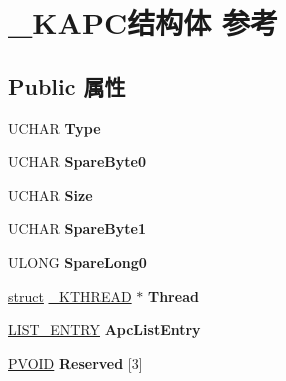 \hypertarget{struct___k_a_p_c}{}\section{\+\_\+\+K\+A\+P\+C结构体 参考}
\label{struct___k_a_p_c}
\subsection*{Public 属性}
\begin{DoxyCompactItemize}
\item 
\mbox{\label{struct___k_a_p_c_a686511290c21cdd0fea845cb82034a51}} 
U\+C\+H\+AR {\bfseries Type}
\item 
\mbox{\label{struct___k_a_p_c_aaeb24478501b33970c47321e8985f81d}} 
U\+C\+H\+AR {\bfseries Spare\+Byte0}
\item 
\mbox{\label{struct___k_a_p_c_a00c12ad5a438060a14a4ac00e5fa17a4}} 
U\+C\+H\+AR {\bfseries Size}
\item 
\mbox{\label{struct___k_a_p_c_adf690aba81a7c1a4b1107ff282859a82}} 
U\+C\+H\+AR {\bfseries Spare\+Byte1}
\item 
\mbox{\label{struct___k_a_p_c_aeaf49d91cfa72cba220980f5cb189299}} 
U\+L\+O\+NG {\bfseries Spare\+Long0}
\item 
\mbox{\label{struct___k_a_p_c_a1c9a19a1ea228a1223e9b8e8ac35fc36}} 
\hyperlink{interfacestruct}{struct} \hyperlink{struct___k_t_h_r_e_a_d}{\+\_\+\+K\+T\+H\+R\+E\+AD} $\ast$ {\bfseries Thread}
\item 
\mbox{\label{struct___k_a_p_c_a56e6f75ddbe45e35bc920edc87efecf7}} 
\hyperlink{struct___l_i_s_t___e_n_t_r_y}{L\+I\+S\+T\+\_\+\+E\+N\+T\+RY} {\bfseries Apc\+List\+Entry}
\item 
\mbox{\label{struct___k_a_p_c_a7fa660256c62c581e66fc5269b7ebdd9}} 
\hyperlink{interfacevoid}{P\+V\+O\+ID} {\bfseries Reserved} \mbox{[}3\mbox{]}
\item 
\mbox{\label{struct___k_a_p_c_a07d11cc934d3247af80a1dbc7d6e5a55}} 

\end{DoxyCompactItemize}
